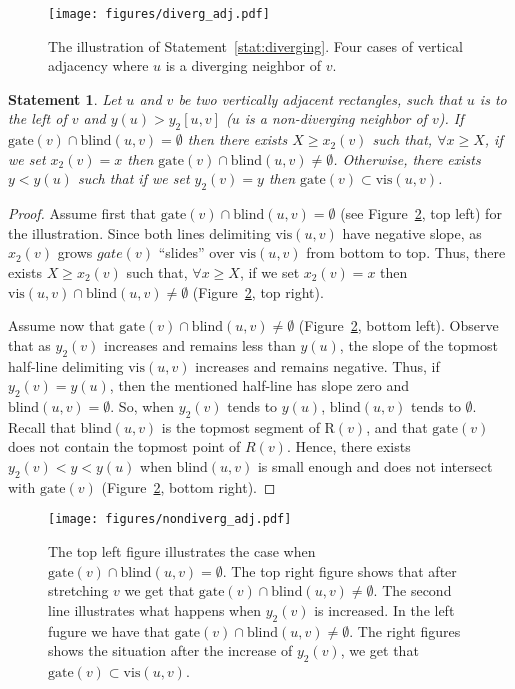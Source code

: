 \documentclass{llncs}
\newtheorem{statement}{Statement}
\newcommand{\gate}{\textrm{gate}}
\newcommand{\vis}{\textrm{vis}}
\newcommand{\blind}{\textrm{blind}}
\newcommand{\R}{\textrm{R}}
\begin{document}
\begin{figure}[htb]
\centering
\texttt{[image: figures/diverg\_adj.pdf]}
\caption{The illustration of Statement~\ref{stat:diverging}. Four cases of vertical adjacency where $u$ is a diverging neighbor of $v$.}
\label{fig:diverg_adj}
\end{figure}





\begin{statement}
\label{stat:non-diverging-above}
Let $u$ and $v$ be two vertically adjacent rectangles, such that $u$ is to the left of $v$ and $y(u) > y_2[u,v]$ ($u$ is a non-diverging neighbor of $v$). If $\gate(v) \cap \blind(u,v) = \emptyset$ then  there exists $X \geq x_2(v)$ such that, $\forall x\geq X$,  if we set $x_2(v) = x$  then $\gate(v) \cap \blind(u,v) \neq \emptyset$.  Otherwise, there exists $y<y(u)$ such that if we set $y_2(v)=y$ then $\gate(v) \subset \vis(u,v)$.
\end{statement}
\begin{proof}
Assume first that $\gate(v) \cap \blind(u,v) = \emptyset$ (see Figure~\ref{fig:nondiverg_adj}, top left) for the illustration.
Since both lines delimiting $\vis(u,v)$ have negative slope, as $x_2(v)$ grows $gate(v)$ ``slides'' over $\vis(u,v)$ 
from bottom to top. Thus, there exists  $X \geq x_2(v)$ such that, $\forall x\geq X$,  if we set $x_2(v) = x$ then $\vis(u,v) \cap \blind(u,v) \neq \emptyset$ (Figure~\ref{fig:nondiverg_adj}, top right). 

Assume now that  $\gate(v) \cap \blind(u,v) \neq \emptyset$ (Figure~\ref{fig:nondiverg_adj}, bottom left). Observe that as $y_2(v)$ increases and remains less than $y(u)$, the slope of the topmost half-line delimiting $\vis(u,v)$ increases and remains negative. Thus, if   $y_2(v)=y(u)$, then the mentioned half-line has slope zero and $\blind(u,v)=\emptyset$. So, when $y_2(v)$ tends to $y(u)$, $\blind(u,v)$ tends to $\emptyset$. Recall that $\blind(u,v)$ is the topmost segment of $\R(v)$, and that $\gate(v)$ does not contain the topmost point of $R(v)$. Hence, there exists $y_2(v)<y<y(u)$ when $\blind(u,v)$ is small enough and does not intersect with $\gate(v)$ (Figure~\ref{fig:nondiverg_adj}, bottom right).  
\end{proof}

\begin{figure}[htb]
\centering
\texttt{[image: figures/nondiverg\_adj.pdf]}

\caption{The top left figure illustrates the case when $\gate(v) \cap \blind(u,v) = \emptyset$.  The top right figure shows that after stretching $v$ we get that $\gate(v) \cap \blind(u,v) \neq \emptyset$. The second line illustrates what happens when $y_2(v)$ is increased. In the left fugure we have that  $\gate(v) \cap \blind(u,v) \neq \emptyset$. The right figures shows the situation after the increase of $y_2(v)$, we get that $\gate(v) \subset \vis(u,v)$.}
\label{fig:nondiverg_adj}
\end{figure}
\end{document}
